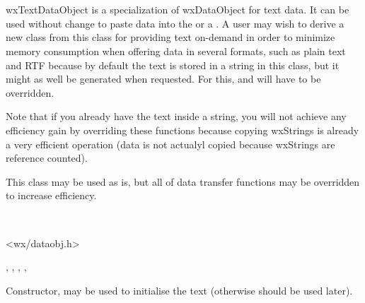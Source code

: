 \section{}\label{wxtextdataobject}

wxTextDataObject is a specialization of wxDataObject for text data. It can be
used without change to paste data into the  
or a . A user may wish to derive a new
class from this class for providing text on-demand in order to minimize memory
consumption when offering data in several formats, such as plain text and RTF
because by default the text is stored in a string in this class, but it might
as well be generated when requested. For this, 
 and 
 will have to be overridden.

Note that if you already have the text inside a string, you will not achieve
any efficiency gain by overriding these functions because copying wxStrings is
already a very efficient operation (data is not actualyl copied because
wxStrings are reference counted).


This class may be used as is, but all of data transfer functions may be
overridden to increase efficiency.


\\


<wx/dataobj.h>


, 
, 
, 
, 


\label{wxtextdataobjectwxtextdataobject}


Constructor, may be used to initialise the text (otherwise 
 should be used later).

